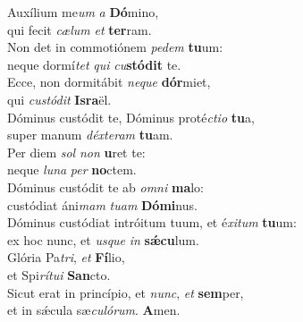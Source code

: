 \evenverse Auxílium me\textit{um} \textit{a} \textbf{Dó}mino,~\*\\
\evenverse qui fecit \textit{cæ}\textit{lum} \textit{et} \textbf{ter}ram.\\
\oddverse Non det in commotiónem \textit{pe}\textit{dem} \textbf{tu}um:~\*\\
\oddverse neque dormí\textit{tet} \textit{qui} \textit{cu}\textbf{stó}\textbf{dit} te.\\
\evenverse Ecce, non dormitábit \textit{ne}\textit{que} \textbf{dór}miet,~\*\\
\evenverse qui \textit{cu}\textit{stó}\textit{dit} \textbf{Is}\textbf{ra}ël.\\
\oddverse Dóminus custódit te, Dóminus proté\textit{cti}\textit{o} \textbf{tu}a,~\*\\
\oddverse super manum \textit{déx}\textit{te}\textit{ram} \textbf{tu}am.\\
\evenverse Per diem \textit{sol} \textit{non} \textbf{u}ret te:~\*\\
\evenverse neque \textit{lu}\textit{na} \textit{per} \textbf{no}ctem.\\
\oddverse Dóminus custódit te ab \textit{om}\textit{ni} \textbf{ma}lo:~\*\\
\oddverse custódiat áni\textit{mam} \textit{tu}\textit{am} \textbf{Dó}\textbf{mi}nus.\\
\evenverse Dóminus custódiat intróitum tuum, et é\textit{xi}\textit{tum} \textbf{tu}um:~\*\\
\evenverse ex hoc nunc, et \textit{us}\textit{que} \textit{in} \textbf{sǽ}\textbf{cu}lum.\\
\oddverse Glória Pa\textit{tri}, \textit{et} \textbf{Fí}lio,~\*\\
\oddverse et Spi\textit{rí}\textit{tu}\textit{i} \textbf{San}cto.\\
\evenverse Sicut erat in princípio, et \textit{nunc}, \textit{et} \textbf{sem}per,~\*\\
\evenverse et in sǽcula sæ\textit{cu}\textit{ló}\textit{rum}. \textbf{A}men.\\

